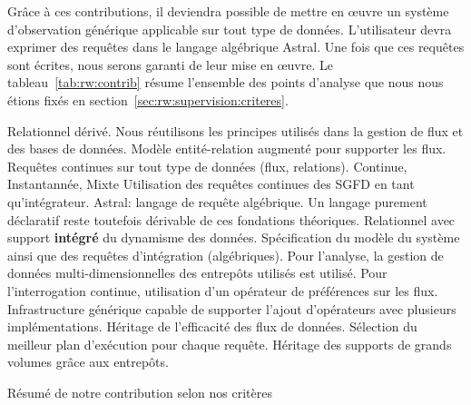 Grâce à ces contributions, il deviendra possible de mettre en œuvre un système d'observation générique applicable sur tout type de données. L'utilisateur devra exprimer des requêtes dans le langage algébrique Astral. Une fois que ces requêtes sont écrites, nous serons garanti de leur mise en œuvre. Le tableau~\ref{tab:rw:contrib} résume l'ensemble des points d'analyse que nous nous étions fixés en section~\ref{sec:rw:supervision:criteres}.
\begin{table}[!ht]
\criteretabDonnee
    {Relationnel dérivé. Nous réutilisons les principes utilisés dans la gestion de flux et des bases de données.}
    {\good Modèle entité-relation augmenté pour supporter les flux.}
    {\good Requêtes continues sur tout type de données (flux, relations).}
\criteretabTraitement
    {\good Continue, Instantannée, Mixte}
    {\good Utilisation des requêtes continues des SGFD en tant qu'intégrateur.}
    {\meh Astral: langage de requête algébrique. Un langage purement déclaratif reste toutefois dérivable de ces fondations théoriques.}
    {\good Relationnel avec support \textbf{intégré} du dynamisme des données.}
\criteretabAdaptabilite
    {\good Spécification du modèle du système ainsi que des requêtes d'intégration (algébriques).}
    {\meh Pour l'analyse, la gestion de données multi-dimensionnelles des entrepôts utilisés est utilisé. Pour l'interrogation continue, utilisation d'un opérateur de préférences sur les flux.}
    {\good Infrastructure générique capable de supporter l'ajout d'opérateurs avec plusieurs implémentations.}
    {\good Héritage de l'efficacité des flux de données. Sélection du meilleur plan d'exécution pour chaque requête. Héritage des supports de grands volumes grâce aux entrepôts.}
\caption{Résumé de notre contribution selon nos critères}\label{tab:rw:contrib}
\end{table}